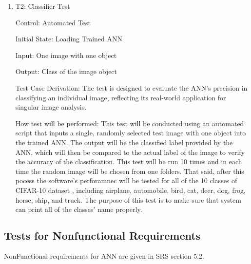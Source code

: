 \documentclass[12pt, titlepage]{article}
\begin{document}
\begin{enumerate}

  \item{T2: Classifier Test\\} \label{T2}

  Control: Automated Test
  
  Initial State: Loading Trained ANN
  
  Input: One image with one object
  
  Output: Class of the image object
  
  Test Case Derivation: The test is designed to evaluate the ANN's precision in classifying an 
  individual image, reflecting its real-world application for singular image analysis.

  How test will be performed: This test will be conducted using an automated script that 
  inputs a single, randomly selected test image with one object into the trained ANN. 
  The output will be the classified label provided by 
   the ANN, which will then be compared to the actual label of the image to verify the accuracy of the classification. 
   This test will be run 10 times and in each time the random image will be chosen from one folders. That said, 
   after this pocess the software's perforamnec will be tested for 
   all of the 10 classes of CIFAR-10 dataset \citep{CIFAR10}, including airplane, 
   automobile, bird, cat, deer, dog, frog, horse, ship, and truck. The purpose of this test is to make sure that 
   system can print all of the classes' name properly.

\end{enumerate}

\subsection{Tests for Nonfunctional Requirements}

NonFunctional requirements for ANN are given in 
SRS \citep{SRS} section 5.2.



\end{document}
